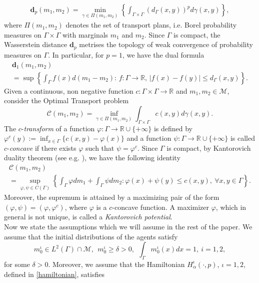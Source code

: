 \documentclass[smallextended,referee,envcountsect,]{svjour3}
\newcommand{\R}{{\mathbb{R}}}
\newcommand{\lra}{\longrightarrow}
\newcommand{\Wass}{\mathbf{d}}
\newcommand{\G}{\Gamma}
\newcommand{\cC}{{\mathcal C}}
\newcommand{\cM}{{\mathcal M}}
\renewcommand{\phi}{\varphi}
\renewcommand{\a}{{\alpha}}
\renewcommand{\d}{{\delta}}
\begin{document}
\begin{align*}
	\Wass_p(m_1,m_2)=\min_{\gamma\in\Pi(m_1,m_2)}\left\{\int_{\G\times\G}(d_\G(x,y))^p d\gamma(x,y) \right\},
\end{align*}
where  $\Pi(m_1,m_2)$ denotes the set of transport plans, i.e. Borel probability measures on $\G\times\G$ with marginals $m_1$ and $m_2$. Since $\G$ is compact, the Wasserstein distance $\Wass_p$ metrises the topology of weak convergence of probability measures on $\G$. In particular, for $p=1$, we have the dual formula
\begin{multline*}%
	{\Wass}_1(m_1,m_2)\\
=\sup\left\{\int_\G f(x)d(m_1-m_2):\, f:\G\lra\R,\,|f(x)-f(y)|\le d_\G(x,y)\right\}.
\end{multline*}
Given a continuous, non negative function $c:\Gamma\times\Gamma \lra\R$ and $m_1,m_2\in \cM$, consider the Optimal Transport problem
\begin{equation*}
	 \cC(m_1, m_2)=\inf_{\gamma\in\Pi(m_1, m_2)}\int_{\Gamma\times\Gamma}c(x, y)d\gamma(x, y).
\end{equation*}
The $c$-{\it transform} of a function $\phi:\Gamma\lra\R\cup\{+\infty\}$ is defined by $\phi^c(y):=\inf_{x\in\Gamma}\{c(x, y)-\phi(x)\}$ and a  function $\psi:\Gamma\lra\R\cup\{+\infty\}$ is called $c$-{\it concave} if there exists   $\phi$ such that $\psi=\phi^c$. 
Since $\G$ is compact, by Kantorovich duality theorem (see e.g. \cite{santambrogio,mugnolo}), we have the following identity  
\begin{multline*}
\cC(m_1, m_2)\\
=\sup_{\phi, \psi\in C(\Gamma)}\left\{\int_{\Gamma}\phi dm_1+\int_{\Gamma}\psi dm_2:\phi(x)+\psi(y)\leq c(x, y),\ \forall x,y\in\Gamma\right\}.
\end{multline*}
Moreover, the supremum is attained by a maximizing pair of the form $(\phi, \psi)=(\phi, \phi^c)$, where $\phi$ is a $c$-concave function. A  maximizer $\phi$, which in general is not unique, is called a {\it Kantorovich potential}.\\
Now we state the assumptions which we will assume in the rest of the paper. We assume that the  initial distributions of the agents satisfy
\begin{equation}\label{initial_cond}	
m_0^\iota\in L^2(\Gamma)\cap\cM, \ \ m_0^\iota\geq\d>0, \ \ \int_{\Gamma}m_0^\iota(x)dx=1, \ i=1,2,
\end{equation}
for some $\d>0$. Moreover, we  assume that  the Hamiltonian $H_\a^\iota(\cdot, p)$, $\iota=1,2$, defined in \eqref{hamiltonian}, satisfies
\end{document}
